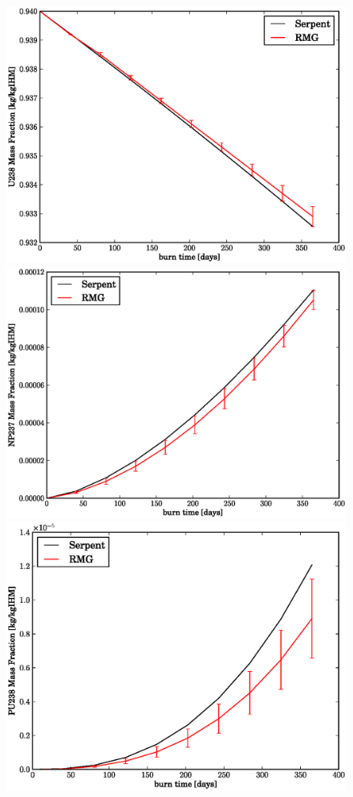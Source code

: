 \begin{figure}[htbp]
\begin{center}
\includegraphics[scale=0.3]{multigroup_method/figs/benchmark/U238_Mass_Fraction_.eps}
\includegraphics[scale=0.3]{multigroup_method/figs/benchmark/NP237_Mass_Fraction_.eps}
\includegraphics[scale=0.3]{multigroup_method/figs/benchmark/PU238_Mass_Fraction_.eps}

\end{center}
\end{figure}
